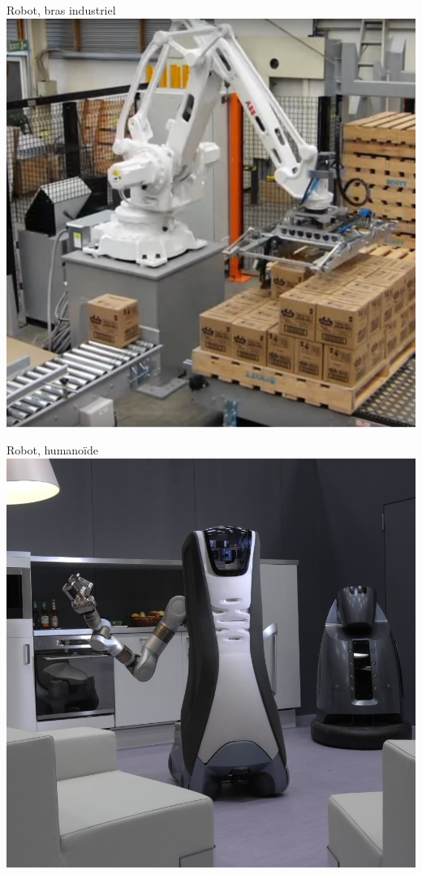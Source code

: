 \begin{minipage}{0.45\linewidth}
    \centering
    Robot, bras industriel\\
    \includegraphics[width=0.95\linewidth]{Figures/Euro-QI2_1}
\end{minipage}
\hfill
\begin{minipage}{0.45\linewidth}
    \centering
    Robot, humanoïde\\
    \includegraphics[width=0.95\linewidth]{Figures/Euro-QI2_2}
\end{minipage}

